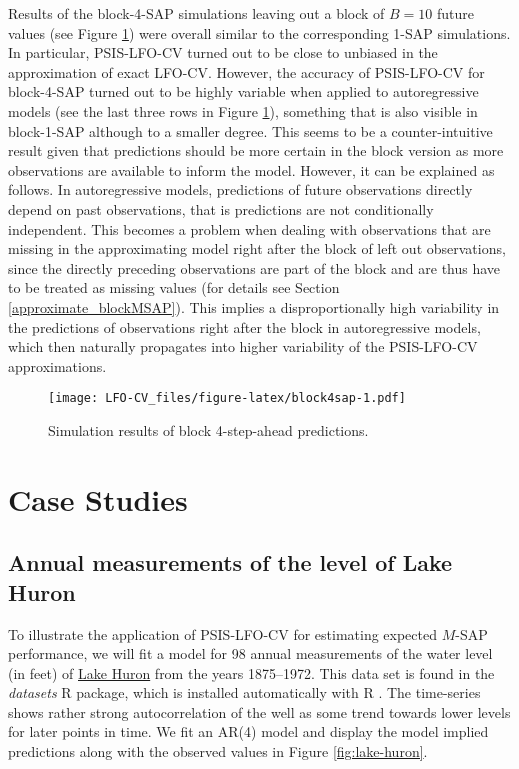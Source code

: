 \documentclass[american,]{article}
\begin{document}
Results of the block-4-SAP simulations leaving out a block of \(B = 10\) future
values (see Figure \ref{fig:block4sap}) were overall similar to the
corresponding 1-SAP simulations. In particular, PSIS-LFO-CV turned out to be
close to unbiased in the approximation of exact LFO-CV. However, the accuracy of
PSIS-LFO-CV for block-4-SAP turned out to be highly variable when applied to
autoregressive models (see the last three rows in Figure \ref{fig:block4sap}),
something that is also visible in block-1-SAP although to a smaller degree. This
seems to be a counter-intuitive result given that predictions should be more
certain in the block version as more observations are available to inform the
model. However, it can be explained as follows. In autoregressive models,
predictions of future observations directly depend on past observations, that is
predictions are not conditionally independent. This becomes a problem when
dealing with observations that are missing in the approximating model right
after the block of left out observations, since the directly preceding
observations are part of the block and are thus have to be treated as missing
values (for details see Section \ref{approximate_blockMSAP}). This implies a
disproportionally high variability in the predictions of observations right
after the block in autoregressive models, which then naturally propagates into
higher variability of the PSIS-LFO-CV approximations.

\begin{figure}
\centering
\texttt{[image: LFO-CV\_files/figure-latex/block4sap-1.pdf]}
\caption{\label{fig:block4sap}Simulation results of block 4-step-ahead predictions.}
\end{figure}

\hypertarget{case-studies}{%
\section{Case Studies}\label{case-studies}}

\hypertarget{annual-measurements-of-the-level-of-lake-huron}{%
\subsection{Annual measurements of the level of Lake Huron}\label{annual-measurements-of-the-level-of-lake-huron}}

To illustrate the application of PSIS-LFO-CV for estimating expected \(M\)-SAP
performance, we will fit a model for 98 annual measurements of the water level
(in feet) of \href{https://en.wikipedia.org/wiki/Lake_Huron}{Lake Huron} from the
years 1875--1972. This data set is found in the \emph{datasets} R package, which is
installed automatically with R \citep{R2018}. The time-series shows rather strong
autocorrelation of the well as some trend towards lower levels for later points
in time. We fit an AR(4) model and display the model implied predictions along
with the observed values in Figure \ref{fig:lake-huron}.
\end{document}
